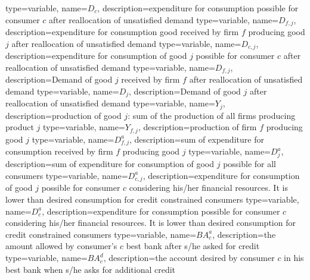 {%
  type=variable,%
  name={$D_{c}$},%
  description={expenditure for consumption possible for consumer $c$ after reallocation of unsatisfied demand} 
}
{%
  type=variable,%
  name={$D_{f,j}$},%
  description={expenditure for consumption good received by firm $f$ producing good $j$ after reallocation of unsatisfied demand} 
}
{%
  type=variable,%
  name={$D_{c,j}$},%
  description={expenditure for consumption of good $j$ possible for consumer $c$ after reallocation of unsatisfied demand} 
}
{%
  type=variable,%
  name={$D_{f,j}$},%
  description={Demand of good $j$ received by firm $f$ after reallocation of unsatisfied demand} 
}
{%
  type=variable,%
  name={$D_{j}$},%
  description={Demand of good $j$ after reallocation of unsatisfied demand} 
}
{%
  type=variable,%
  name={$Y_{j}$},%
  description={production of good $j$: sum of the production of all firms producing product $j$} 
}
{%
  type=variable,%
  name={$Y_{f,j}$},%
  description={production of firm $f$ producing good $j$} 
}
{%
  type=variable,%
  name={$D^a_{f,j}$},%
  description={sum of expenditure for consumption received by firm $f$ producing good $j$} 
}
{%
  type=variable,%
  name={$D^a_{j}$},%
  description={sum of expenditure for consumption of good $j$ possible for all consumers} 
}
{%
  type=variable,%
  name={$D^a_{c,j}$},%
  description={expenditure for consumption of good $j$ possible for consumer $c$ considering his/her financial resources. It is lower than desired consumption for credit constrained consumers} 
}
{%
  type=variable,%
  name={$D^a_{c}$},%
  description={expenditure for consumption possible for consumer $c$ considering his/her financial resources. It is lower than desired consumption for credit constrained consumers} 
}
{%
  type=variable,%
  name={$BA^a_{c}$},%
  description={the amount allowed by consumer's $c$ best bank after s/he asked for credit} 
}
{%
  type=variable,%
  name={$BA^d_{c}$},%
  description={the account desired by consumer $c$ in his best bank when s/he asks for additional credit} 
}
